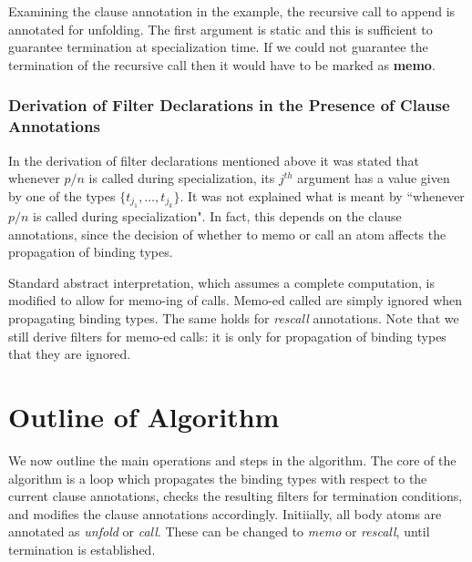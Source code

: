 \documentclass[12pt,twoside]{article}
\begin{document}
Examining the clause annotation in the example,
the recursive call to append is annotated for unfolding. The first argument is static and
this is sufficient to guarantee termination at specialization time.  If we could not guarantee the termination of the recursive call then it would have to be marked as {\bf memo}.

\subsubsection{Derivation of Filter Declarations in the Presence of Clause Annotations}

In the derivation of filter declarations mentioned above it was stated
that whenever $p/n$ is called during specialization, its $j^{th}$
argument has a value given by one of the types $\{t_{j_1},\ldots,t_{j_k}\}$.
It was not explained what is meant by ``whenever $p/n$ is called during specialization".
In fact, this depends on the clause annotations, since the decision of whether
to memo or call an atom affects the propagation of binding types.

Standard abstract interpretation, which assumes a complete computation,
 is modified to allow for memo-ing of calls.  Memo-ed called are simply
ignored when propagating binding types.  The same holds for {\em rescall}
annotations.  Note that we still derive filters for memo-ed calls:  it is
only for propagation of binding types that they are ignored.

\section{Outline of Algorithm}
We now outline the main operations and steps in the algorithm.
The core of the algorithm is a loop which propagates the binding types
with respect to the current clause annotations, checks the resulting filters
for termination conditions, and modifies the clause annotations accordingly.
Initiially, all body atoms are annotated as {\em unfold} or {\em call}.
These can be changed to {\em memo} or {\em rescall}, until termination
is established. 
\end{document}
